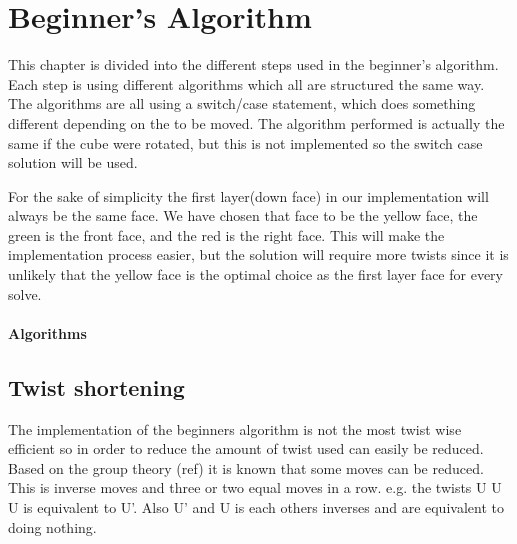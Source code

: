 \chapter{Beginner's Algorithm}

This chapter is divided into the different steps used in the beginner's algorithm.
Each step is using different algorithms which all are structured the same way. The algorithms are all using a switch/case statement, which does something different depending on the \cpiece{} to be moved. The algorithm performed is actually the same if the cube were rotated, but this is not implemented so the switch case solution will be used.

For the sake of simplicity the first layer(down face) in our implementation will always be the same face. We have chosen that face to be the yellow face, the green is the front face, and the red is the right face. This will make the implementation process easier, but the solution will require more twists since it is unlikely that the yellow face is the optimal choice as the first layer face for every solve.

\subsubsection{Algorithms}










\section{Twist shortening}
The implementation of the beginners algorithm is not the most twist wise efficient so in order to reduce the amount of twist used can easily be reduced. Based on the group theory (ref) it is known that some moves can be reduced. This is inverse moves and  three or two equal moves  in a row. e.g.  the twists U U U is equivalent to U'. Also U' and U is each others inverses and are equivalent to doing nothing. 